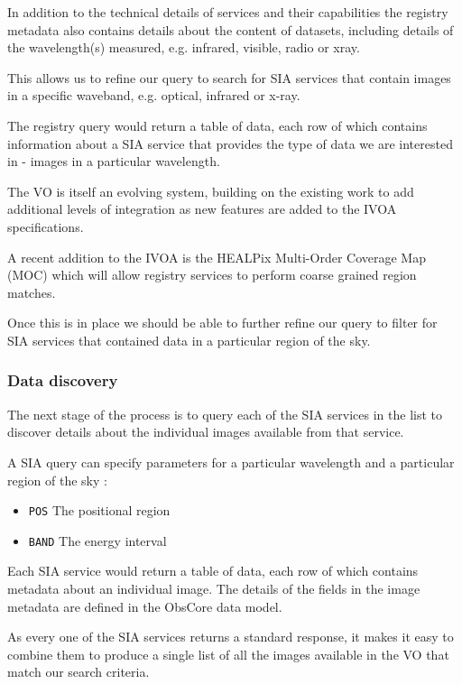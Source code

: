 \documentclass{article}
\begin{document}
In addition to the technical details of services and their capabilities the
registry metadata also contains details about the content of datasets, including
details of the wavelength(s) measured, e.g. infrared, visible, radio or xray.

This allows us to refine our query to search for SIA services that contain
images in a specific waveband, e.g. optical, infrared or x-ray.

The registry query would return a table of data, each row of which contains
information about a SIA service that provides the type of data we are
interested in - images in a particular wavelength.

The VO is itself an evolving system, building on the existing work to add
additional levels of integration as new features are added to the IVOA
specifications.

A recent addition to the IVOA is the HEALPix Multi-Order Coverage Map (MOC)
which will allow registry services to perform coarse grained region matches.

Once this is in place we should be able to further refine our query to filter
for SIA services that contained data in a particular region of the sky.

\subsubsection{Data discovery}

The next stage of the process is to query each of the SIA services in the list
to discover details about the individual images available from that service.

\noindent
A SIA query can specify parameters for a particular wavelength and a particular
region of the sky :
\begin{itemize}
  \item \texttt{POS}  The positional region
  \item \texttt{BAND} The energy interval
\end{itemize}

Each SIA service would return a table of data, each row of which contains
metadata about an individual image. The details of the fields in the
image metadata are defined in the ObsCore
data model.

As every one of the SIA services returns a standard response, it makes it easy
to combine them to produce a single list of all the images available in the VO
that match our search criteria.
\end{document}
